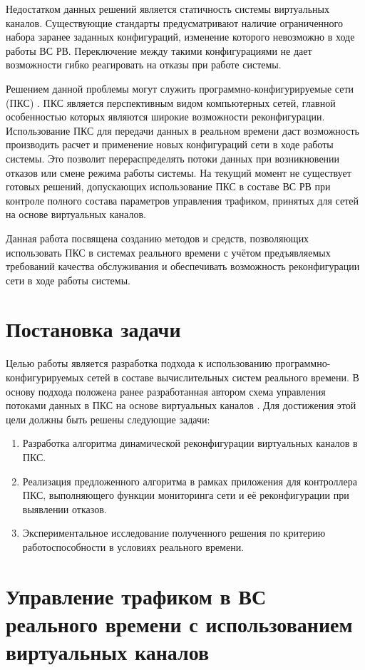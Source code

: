 \documentclass[12pt, a4paper]{article}
\begin{document}
Недостатком данных решений является статичность системы виртуальных каналов. Существующие стандарты предусматривают наличие ограниченного набора заранее заданных конфигураций, изменение которого невозможно в ходе работы ВС РВ. Переключение между такими конфигурациями не дает возможности гибко реагировать на отказы при работе системы.

Решением данной проблемы могут служить программно-конфигурируемые сети (ПКС) \cite{sdn}. ПКС является перспективным видом компьютерных сетей, главной особенностью которых являются широкие возможности реконфигурации. Использование ПКС для передачи данных в реальном времени даст возможность производить расчет и применение новых конфигураций сети в ходе работы системы. Это позволит перераспределять потоки данных при возникновении отказов или смене режима работы системы. На текущий момент не существует готовых решений, допускающих использование ПКС в составе ВС РВ при контроле полного состава параметров управления трафиком, принятых для сетей на основе виртуальных каналов.

Данная работа посвящена созданию методов и средств, позволяющих использовать ПКС в системах реального времени с учётом предъявляемых требований качества обслуживания и обеспечивать возможность реконфигурации сети в ходе работы системы.

\section{Постановка задачи}
Целью работы является разработка подхода к использованию программно-конфигурируемых сетей в составе вычислительных систем реального времени. В основу подхода положена ранее разработанная автором схема управления потоками данных в ПКС на основе виртуальных каналов \cite{vlsdn}. Для достижения этой цели должны быть решены следующие задачи:
\begin{enumerate}
	\item Разработка алгоритма динамической реконфигурации виртуальных каналов в ПКС.
	\item Реализация предложенного алгоритма в рамках приложения для контроллера ПКС, выполняющего функции мониторинга сети и её реконфигурации при выявлении отказов.
	\item Экспериментальное исследование полученного решения по критерию работоспособности в условиях реального времени.
\end{enumerate}

\section{Управление трафиком в ВС реального времени с использованием виртуальных каналов} \label{sec:scheme}
\end{document}
